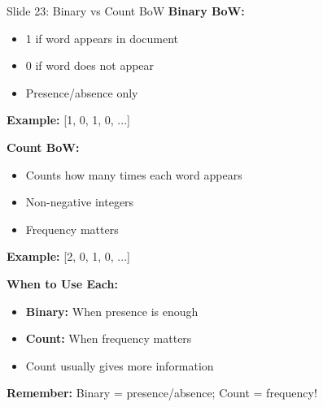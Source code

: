 \documentclass[8pt]{beamer}
\begin{document}
	\begin{frame}{Slide 23: Binary vs Count BoW}
		\fontsize{6.5}{7.5}\selectfont
		\textbf{Binary BoW:}
		\begin{itemize}
			\item 1 if word appears in document
			\item 0 if word does not appear
			\item Presence/absence only
		\end{itemize}
		\textbf{Example:} [1, 0, 1, 0, ...]
		
		\vspace{0.1cm}
		\textbf{Count BoW:}
		\begin{itemize}
			\item Counts how many times each word appears
			\item Non-negative integers
			\item Frequency matters
		\end{itemize}
		\textbf{Example:} [2, 0, 1, 0, ...]
		
		\vspace{0.1cm}
		\textbf{When to Use Each:}
		\begin{itemize}
			\item \textbf{Binary:} When presence is enough
			\item \textbf{Count:} When frequency matters
			\item Count usually gives more information
		\end{itemize}
		
		\textcolor{myblue}{\textbf{Remember:}} Binary = presence/absence; Count = frequency!
	\end{frame}
	
\end{document}
